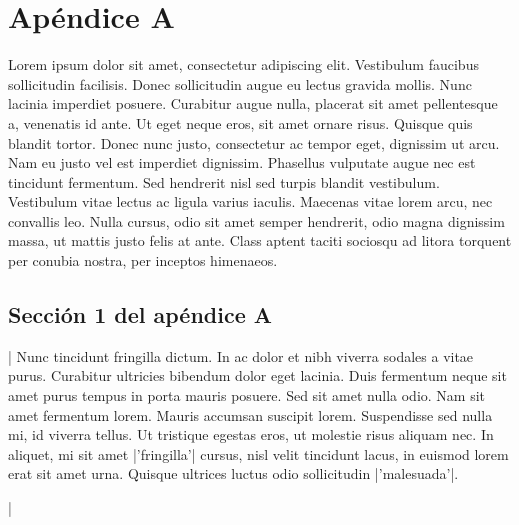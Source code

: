 \chapter{Apéndice A}
Lorem ipsum dolor sit amet, consectetur adipiscing elit. Vestibulum faucibus
sollicitudin facilisis. Donec sollicitudin augue eu lectus gravida mollis.
Nunc lacinia imperdiet posuere. Curabitur augue nulla, placerat sit amet
pellentesque a, venenatis id ante. Ut eget neque eros, sit amet ornare risus.
Quisque quis blandit tortor. Donec nunc justo, consectetur ac tempor eget,
dignissim ut arcu. Nam eu justo vel est imperdiet dignissim. Phasellus
vulputate augue nec est tincidunt fermentum. Sed hendrerit nisl sed turpis
blandit vestibulum. Vestibulum vitae lectus ac ligula varius iaculis. Maecenas
vitae lorem arcu, nec convallis leo. Nulla cursus, odio sit amet semper
hendrerit, odio magna dignissim massa, ut mattis justo felis at ante. Class
aptent taciti sociosqu ad litora torquent per conubia nostra, per inceptos
himenaeos.

\section{Sección 1 del apéndice A}\label{sec:apendice}
\lstCppMakeShortInline|
Nunc tincidunt fringilla dictum. In ac dolor et nibh viverra sodales a vitae
purus. Curabitur ultricies bibendum dolor eget lacinia. Duis fermentum neque
sit amet purus tempus in porta mauris posuere. Sed sit amet nulla odio. Nam
sit amet fermentum lorem. Mauris accumsan suscipit lorem. Suspendisse sed
nulla mi, id viverra tellus. Ut tristique egestas eros, ut molestie risus
aliquam nec. In aliquet, mi sit amet |'fringilla'| cursus, nisl velit
tincidunt lacus, in euismod lorem erat sit amet urna. Quisque ultrices luctus
odio sollicitudin |'malesuada'|.

\lstDeleteShortInline|
